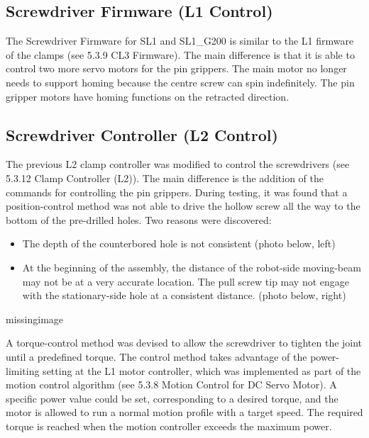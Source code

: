 \subsection{Screwdriver Firmware (L1 Control)}
\label{subsection:exploration-4-screwdriver-firmware-l1-control}

The Screwdriver Firmware for SL1 and SL1\_G200 is similar to the L1 firmware of the clamps (see 5.3.9 CL3 Firmware). The main difference is that it is able to control two more servo motors for the pin grippers.
The main motor no longer needs to support homing because the centre screw can spin indefinitely. The pin gripper motors have homing functions on the retracted direction.

\subsection{Screwdriver Controller (L2 Control)}
\label{subsection:exploration-4-screwdriver-controller-l2-control}

The previous L2 clamp controller was modified to control the screwdrivers (see 5.3.12 Clamp Controller (L2)). The main difference is the addition of the commands for controlling the pin grippers. 
During testing, it was found that a position-control method was not able to drive the hollow screw all the way to the bottom of the pre-drilled holes. Two reasons were discovered: 
\begin{itemize}
    \item The depth of the counterbored hole is not consistent (photo below, left)
    \item At the beginning of the assembly, the distance of the robot-side moving-beam may not be at a very accurate location. The pull screw tip may not engage with the stationary-side hole at a consistent distance. (photo below, right)
\end{itemize}

missingimage

A torque-control method was devised to allow the screwdriver to tighten the joint until a predefined torque. The control method takes advantage of the power-limiting setting at the L1 motor controller, which was implemented as part of the motion control algorithm (see 5.3.8 Motion Control for DC Servo Motor). A specific power value could be set, corresponding to a desired torque, and the motor is allowed to run a normal motion profile with a target speed. The required torque is reached when the motion controller exceeds the maximum power. 

